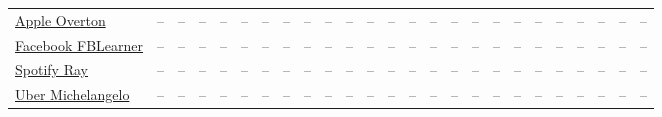 {\begin{longtable}{@{}p{3.1cm} *{24}{c} @{}}
\raggedright \href{https://machinelearning.apple.com/research/overton}{Apple Overton} & -- & -- & -- & -- & -- & -- & -- & -- & -- & -- & -- & -- & -- & -- & -- & -- & -- & -- & -- & -- & -- & -- & -- & -- \\
\raggedright \href{https://engineering.fb.com/2016/05/09/core-infra/introducing-fblearner-flow-facebook-s-ai-backbone/}{Facebook FBLearner} & -- & -- & -- & -- & -- & -- & -- & -- & -- & -- & -- & -- & -- & -- & -- & -- & -- & -- & -- & -- & -- & -- & -- & -- \\
\raggedright \href{https://engineering.atspotify.com/2023/02/unleashing-ml-innovation-at-spotify-with-ray}{Spotify Ray} & -- & -- & -- & -- & -- & -- & -- & -- & -- & -- & -- & -- & -- & -- & -- & -- & -- & -- & -- & -- & -- & -- & -- & -- \\
\raggedright \href{https://www.uber.com/us/en/blog/michelangelo-machine-learning-platform/}{Uber Michelangelo} & -- & -- & -- & -- & -- & -- & -- & -- & -- & -- & -- & -- & -- & -- & -- & -- & -- & -- & -- & -- & -- & -- & -- & -- \\
\bottomrule
\end{longtable}}
